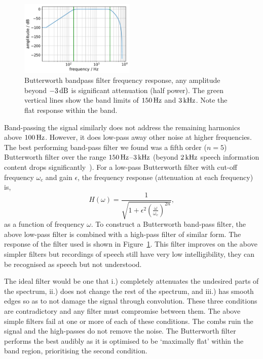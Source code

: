 \documentclass[paper-main.tex]{subfiles}
\begin{document}


\begin{figure}
	\includegraphics[width=0.49\textwidth]{figures/butterworth_150_3000-cropped.pdf}
	\caption{Butterworth bandpass filter frequency response, any amplitude beyond $-3\,{\rm dB}$ is significant attenuation (half power). The green vertical lines show the band limits of $150\,{\rm Hz}$ and $3\,{\rm kHz}$. Note the flat response within the band.}
	\label{fig:butterworth}
\end{figure}


Band-passing the signal similarly does not address the remaining harmonics above $100\,{\rm Hz}$. 
However, it does low-pass away other noise at higher frequencies. 
The best performing band-pass filter we found was a fifth order ($n = 5$) Butterworth filter over the range $150\,{\rm Hz}$--$3\,{\rm kHz}$ (beyond $2\,{\rm kHz}$ speech information content drops significantly~\cite{speech_intelligibility}). 
For a low-pass Butterworth filter with cut-off frequency $\omega_c$ and gain $\epsilon$, the frequency response (attenuation at each frequency) is,
\begin{equation}
\label{eq:butterworth}
H(\omega) = \frac{1}{\sqrt{1+\epsilon^2 (\frac{\omega}{\omega_c})^{2n}}},
\end{equation}
as a function of frequency $\omega$. 
To construct a Butterworth band-pass filter, the above low-pass filter is combined with a high-pass filter of similar form. 
The response of the filter used is shown in Figure~\ref{fig:butterworth}. 
This filter improves on the above simpler filters but recordings of speech still have very low intelligibility, they can be recognised as speech but not understood.


The ideal filter would be one that i.) completely attenuates the undesired parts of the spectrum, ii.) does not change the rest of the spectrum, and iii.) has smooth edges so as to not damage the signal through convolution. 
These three conditions are contradictory and any filter must compromise between them. 
The above simple filters fail at one or more of each of these conditions. 
The combs ruin the signal and the high-passes do not remove the noise. 
The Butterworth filter performs the best audibly as it is optimised to be `maximally flat' within the band region, prioritising the second condition.
\end{document}
